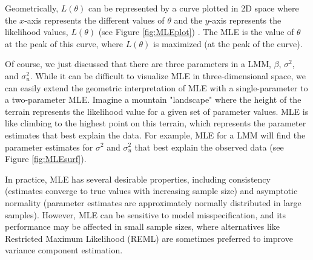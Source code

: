 Geometrically, $L(\theta)$ can be represented by a curve plotted in 2D space where the $x$-axis represents the different values of $\theta$ and the $y$-axis represents the likelihood values, $L(\theta)$ (see Figure \ref{fig:MLEplot}) . The MLE is the value of $\theta$ at the peak of this curve, where $L(\theta)$ is maximized (at the peak of the curve).

Of course, we just discussed that there are three parameters in a LMM, $\beta$, $\sigma^2$, and $\sigma_u^2$.  While it can be difficult to visualize MLE in three-dimensional space, we can easily extend the geometric interpretation of MLE with a single-parameter to a two-parameter MLE. Imagine a mountain "landscape" where the height of the terrain represents the likelihood value for a given set of parameter values. MLE is like climbing to the highest point on this terrain, which represents the parameter estimates that best explain the data.  For example, MLE for a LMM will find the parameter estimates for $\sigma^2$ and $\sigma_u^2$ that best explain the observed data (see Figure \ref{fig:MLEsurf}).
 
 In practice, MLE has several desirable properties, including consistency (estimates converge to true values with increasing sample size) and asymptotic normality (parameter estimates are approximately normally distributed in large samples). However, MLE can be sensitive to model misspecification, and its performance may be affected in small sample sizes, where alternatives like Restricted Maximum Likelihood (REML) are sometimes preferred to improve variance component estimation.

